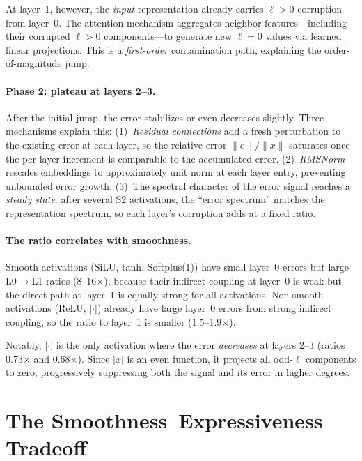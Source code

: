 \documentclass[10pt,twocolumn]{article}
\begin{document}
At layer~1, however, the \emph{input} representation already carries $\ell{>}0$ corruption
from layer~0. The attention mechanism aggregates neighbor features---including their
corrupted $\ell{>}0$ components---to generate new $\ell{=}0$ values via learned linear
projections. This is a \emph{first-order} contamination path, explaining the order-of-magnitude
jump.

\paragraph{Phase 2: plateau at layers 2--3.}
After the initial jump, the error stabilizes or even decreases slightly. Three mechanisms
explain this: (1)~\emph{Residual connections} add a fresh perturbation to the existing
error at each layer, so the relative error $\|e\|/\|x\|$ saturates once the per-layer
increment is comparable to the accumulated error. (2)~\emph{RMSNorm} rescales embeddings
to approximately unit norm at each layer entry, preventing unbounded error growth.
(3)~The spectral character of the error signal reaches a \emph{steady state}: after
several S2 activations, the ``error spectrum'' matches the representation spectrum,
so each layer's corruption adds at a fixed ratio.

\paragraph{The ratio correlates with smoothness.}
Smooth activations (SiLU, tanh, Softplus(1)) have small layer~0 errors but large
L0$\to$L1 ratios (8--16$\times$), because their indirect coupling at layer~0 is weak
but the direct path at layer~1 is equally strong for all activations. Non-smooth
activations (ReLU, $|\cdot|$) already have large layer~0 errors from strong indirect
coupling, so the ratio to layer~1 is smaller (1.5--1.9$\times$).

Notably, $|\cdot|$ is the only activation where the error \emph{decreases} at layers
2--3 (ratios 0.73$\times$ and 0.68$\times$). Since $|x|$ is an even function, it
projects all odd-$\ell$ components to zero, progressively suppressing both the signal
and its error in higher degrees.

\section{The Smoothness--Expressiveness Tradeoff}
\label{sec:tradeoff}
\end{document}
